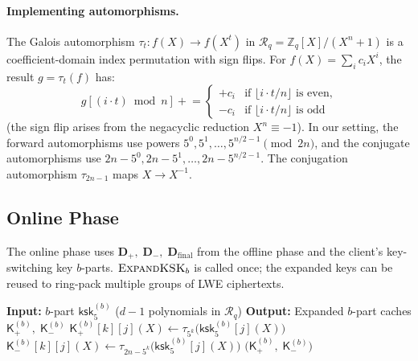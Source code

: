 \documentclass[11pt,a4paper]{article}
\newcommand{\Z}{\mathbb{Z}}
\newcommand{\R}{\mathcal{R}}
\newcommand{\Rq}{\R_{q}}
\begin{document}
\paragraph{Implementing automorphisms.}
The Galois automorphism $\tau_t : f(X) \to f(X^t)$ in $\Rq = \Z_q[X]/(X^n+1)$ is a coefficient-domain index permutation with sign flips.
For $f(X) = \sum_{i} c_i X^i$, the result $g = \tau_t(f)$ has:
\[
    g[(i \cdot t) \bmod n] \mathrel{+}=
    \begin{cases}
        +c_i & \text{if } \lfloor i \cdot t / n \rfloor \text{ is even,} \\
        -c_i & \text{if } \lfloor i \cdot t / n \rfloor \text{ is odd}
    \end{cases}
\]
(the sign flip arises from the negacyclic reduction $X^n \equiv -1$).
In our setting, the forward automorphisms use powers $5^0, 5^1, \ldots, 5^{n/2-1} \pmod{2n}$, and the conjugate automorphisms use $2n - 5^0, 2n - 5^1, \ldots, 2n - 5^{n/2-1}$.
The conjugation automorphism $\tau_{2n-1}$ maps $X \to X^{-1}$.

\subsection{Online Phase}\label{sec:packing-online}

The online phase uses $\mathbf{D}_{+},\; \mathbf{D}_{-},\; \mathbf{D}_{\mathrm{final}}$ from the offline phase and the client's key-switching key $b$-parts.
$\textsc{ExpandKSK}_b$ is called once; the expanded keys can be reused to ring-pack multiple groups of LWE ciphertexts.

\begin{algorithm}[H]
\caption{$\textsc{ExpandKSK}_b(\mathsf{ksk}_5^{(b)})$: Expand KSK $b$-parts.}
\label{alg:expand-ksk}
\begin{algorithmic}[1]
\State \textbf{Input:} $b$-part $\mathsf{ksk}_5^{(b)}$ ($d\!-\!1$ polynomials in $\Rq$)
\State \textbf{Output:} Expanded $b$-part caches $\mathsf{K}_{+}^{(b)},\; \mathsf{K}_{-}^{(b)}$
\Statex
{} 
        \State $\mathsf{K}_{+}^{(b)}[k][j](X) \gets \tau_{5^k}\!\bigl(\mathsf{ksk}_5^{(b)}[j](X)\bigr)$
        \State $\mathsf{K}_{-}^{(b)}[k][j](X) \gets \tau_{2n-5^k}\!\bigl(\mathsf{ksk}_5^{(b)}[j](X)\bigr)$
    \EndFor
\EndFor
\State \Return $\bigl(\mathsf{K}_{+}^{(b)},\; \mathsf{K}_{-}^{(b)}\bigr)$
\end{algorithmic}
\end{algorithm}
\end{document}

